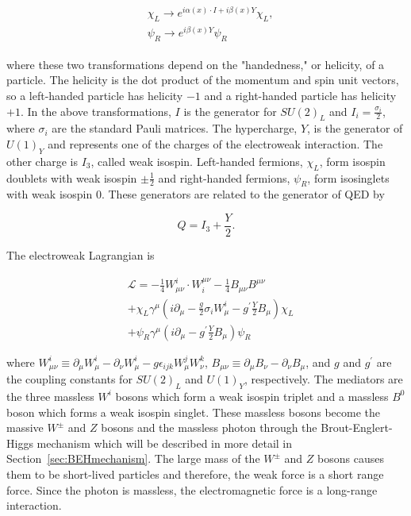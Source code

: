 
\begin{align}
\begin{split}
&\chi_{L}\rightarrow e^{i\alpha (x)\cdot I + i\beta (x)Y}\chi_{L},
\\
&\psi_{R} \rightarrow e^{i\beta(x)Y}\psi_{R}
\end{split}
\end{align}

\noindent
where these two transformations depend on the "handedness," or helicity, of a particle. The helicity is the dot product of the momentum and spin unit vectors, so a left-handed particle has helicity $-1$ and a right-handed particle has helicity $+1$. In the above transformations, $I$ is the generator for $SU(2)_{L}$ and $I_{i}=\frac{\sigma_{i}}{2}$, where $\sigma_{i}$ are the standard Pauli matrices. The hypercharge, $Y$, is the generator of $U(1)_{Y}$ and represents one of the charges of the electroweak interaction. The other charge is $I_{3}$, called weak isospin. Left-handed fermions, $\chi_{L}$, form isospin doublets with weak isospin $\pm\frac{1}{2}$ and right-handed fermions, $\psi_{R}$, form isosinglets with weak isospin $0$. These generators are related to the generator of QED by

\begin{equation}
Q=I_{3}+\frac{Y}{2}.
\end{equation}

\noindent
The electroweak Lagrangian is

\begin{equation}
\begin{split}
&\mathcal{L}=-\frac{1}{4}W^{i}_{\mu\nu}\cdot W_{i}^{\mu\nu} -\frac{1}{4}B_{\mu\nu}B^{\mu\nu} \\
& +\chi_{L}\gamma^{\mu}(i\partial_{\mu}-\frac{g}{2}\sigma_{i}W^{i}_{\mu}-g^{\prime}\frac{Y}{2}B_{\mu})\chi_{L} \\
& + \psi_{R}\gamma^{\mu}(i\partial_{\mu}-g^{\prime}\frac{Y}{2}B_{\mu})\psi_{R}
\end{split}
\end{equation}

\noindent
where $W^{i}_{\mu\nu} \equiv \partial_{\mu}W^{i}_{\mu}-\partial_{\nu}W^{i}_{\mu} -g\epsilon_{ijk}W^{j}_{\mu}W^{k}_{\nu}$, $B_{\mu\nu}\equiv \partial_{\mu}B_{\nu}-\partial_{\nu}B_{\mu}$, and $g$ and $g^{\prime}$ are the coupling constants for $SU(2)_{L}$ and $U(1)_{Y}$, respectively. The mediators are the three massless $W^{i}$ bosons which form a weak isospin triplet and a massless $B^{0}$ boson which forms a weak isospin singlet. These massless bosons become the massive $W^{\pm}$ and $Z$ bosons and the massless photon through the Brout-Englert-Higgs mechanism which will be described in more detail in Section~\ref{sec:BEHmechanism}. The large mass of the $W^{\pm}$ and $Z$ bosons causes them to be short-lived particles and therefore, the weak force is a short range force. Since the photon is massless, the electromagnetic force is a long-range interaction.



